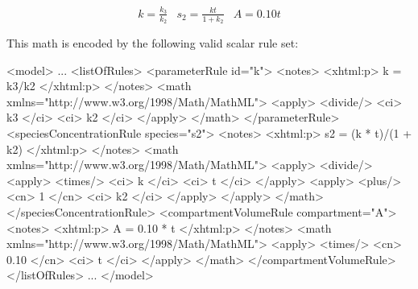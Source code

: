 \documentclass[10pt]{cekarticle}
\begin{document}
\begin{equation*}
  \begin{array}{lll}
    k = \frac{k_3}{k_2} & s_2 = \frac{k t}{1 + k_2} & A = 0.10 t\\ \\[-4pt]
  \end{array}
\end{equation*}
This math is encoded by the following valid scalar rule set:
\begin{example}
<model>
    ...
    <listOfRules>
        <parameterRule id="k">
            <notes>
                <xhtml:p>
                    k = k3/k2
                </xhtml:p>
            </notes>
            <math xmlns="http://www.w3.org/1998/Math/MathML">
                <apply>
                    <divide/>
                    <ci> k3 </ci>
                    <ci> k2 </ci>
                </apply>
            </math>
        </parameterRule>
        <speciesConcentrationRule species="s2">
            <notes>
                <xhtml:p>
                    s2 = (k * t)/(1 + k2)
                </xhtml:p>
            </notes>
            <math xmlns="http://www.w3.org/1998/Math/MathML">
                <apply>
                    <divide/>
                    <apply>
                        <times/>
                        <ci> k </ci>
                        <ci> t </ci>
                    </apply>
                    <apply>
                        <plus/>
                        <cn> 1 </cn>
                        <ci> k2 </ci>
                    </apply>
                </apply>
            </math>
        </speciesConcentrationRule>
        <compartmentVolumeRule compartment="A">
            <notes>
                <xhtml:p>
                    A = 0.10 * t
                </xhtml:p>
            </notes>
            <math xmlns="http://www.w3.org/1998/Math/MathML">
                <apply>
                    <times/>
                    <cn> 0.10 </cn>
                    <ci> t </ci>
                </apply>
            </math>
        </compartmentVolumeRule>
    </listOfRules>
    ...
</model>
\end{example}
\end{document}
